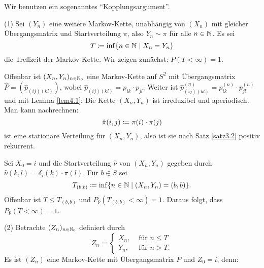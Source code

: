 \documentclass[a4paper,twoside,DIV15,BCOR12mm]{scrbook}
\begin{document}
\begin{beweis}
Wir benutzen ein sogenanntes ``Kopplungsargument''.

(1) Sei $(Y_n)$ eine weitere Markov-Kette, unabhängig von $(X_n)$ mit gleicher Übergangsmatrix und Startverteilung $\pi$, also $Y_n\sim \pi$ für alle $n\in \mathbb{N}$. Es sei
\[
T\da \inf\{n\in \MdN \mid X_n = Y_n\}
\]
die Treffzeit der Markov-Kette. Wir zeigen zunächst: $P(T<\infty) = 1$.

Offenbar ist $(X_n,Y_n)_{n\in\mathbb{N}_0}$ eine Markov-Kette auf $S^2$ mit Übergangsmatrix $\hat P=(\hat p_{(ij)(kl)})$, wobei $\hat p_{(ij)(kl)} = p_{ik}\cdot p_{jl}$. Weiter ist $\hat p_{(ij)(kl)}^{(n)} = p_{ik}^{(n)} \cdot p_{jl}^{(n)}$ und mit Lemma \ref{lem4.1}: Die Kette $(X_n,Y_n)$ ist irreduzibel und aperiodisch. Man kann nachrechnen:
\[
\hat \pi (i,j) \da \pi(i)\cdot\pi(j)
\]
ist eine stationäre Verteilung für $(X_n,Y_n)$, also ist sie nach Satz \ref{satz3.2} positiv rekurrent.

Sei $X_0=i$ und die Startverteilung $\hat \nu$ von $(X_n,Y_n)$ gegeben durch $\hat \nu (k,l) = \delta_i(k) \cdot\pi(l)$. Für $b\in S$ sei 
\[
T_{(b,b)} \da \inf\{n\in\MdN \mid (X_n,Y_n) = (b,b) \}.
\]
Offenbar ist $T\le T_{(b,b)}$ und $P_{\hat \nu}(T_{(b,b)}<\infty)=1$. Daraus folgt, dass $P_{\hat \nu}(T<\infty)=1$.


(2) Betrachte $(Z_n)_{n\in\mathbb{N}_0}$ definiert durch
\[
Z_n= 
\begin{cases}
X_n, &\text{ für } n\le T \\
Y_n, &\text{ für } n>T.
\end{cases}
\]
Es ist $(Z_n)$ eine Markov-Kette mit Übergangsmatrix $P$ und $Z_0=i$, denn:


\end{beweis}
\end{document}
